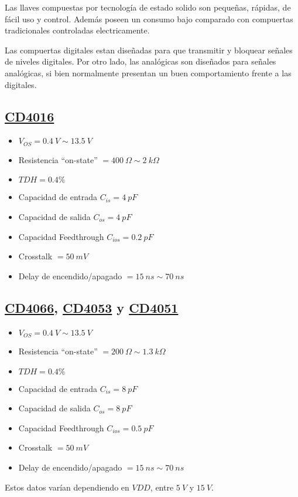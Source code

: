 



Las llaves compuestas por tecnología de estado solido son pequeñas, rápidas, de fácil uso y control. Además poseen un consumo bajo comparado con compuertas tradicionales controladas electricamente.

Las compuertas digitales estan diseñadas para que transmitir y bloquear señales de niveles digitales. Por otro lado, las analógicas son diseñados para señales analógicas, si bien normalmente presentan un buen comportamiento frente a las digitales.

\subsection{\href{http://www.ti.com/lit/ds/symlink/cd4016b.pdf}{CD4016}}
\begin{multicols}{2}
\begin{itemize}
	\item $V_{OS} = 0.4 \ V \sim 13.5 \ V$
	\item Resistencia ``on-state'' $= 400 \ \Omega \sim 2 \ k\Omega$
	\item $TDH = 0.4\%$
	\item Capacidad de entrada $C_{is} = 4 \ pF$
	\item Capacidad de salida $C_{os} = 4 \ pF$
	\item Capacidad Feedthrough $C_{ios} = 0.2 \ pF$
	\item Crosstalk $= 50 \ mV$
	\item Delay de encendido/apagado $= 15 \ ns \sim 70 \ ns$
\end{itemize}
\end{multicols}

\subsection{\href{http://www.ti.com/lit/ds/symlink/cd4066b.pdf}{CD4066}, \href{http://www.ti.com/lit/ds/symlink/cd4051b.pdf}{CD4053} y \href{http://www.ti.com/lit/ds/symlink/cd4051b.pdf}{CD4051}}
\begin{multicols}{2}
\begin{itemize}
	\item $V_{OS} = 0.4 \ V \sim 13.5 \ V$
	\item Resistencia ``on-state'' $= 200 \ \Omega \sim 1.3 \ k\Omega$
	\item $TDH = 0.4\%$
	\item Capacidad de entrada $C_{is} = 8 \ pF$
	\item Capacidad de salida $C_{os} = 8 \ pF$
	\item Capacidad Feedthrough $C_{ios} = 0.5 \ pF$
	\item Crosstalk $= 50 \ mV$
	\item Delay de encendido/apagado $= 15 \ ns \sim 70 \ ns$
\end{itemize}
\end{multicols}
Estos datos varían dependiendo en $VDD$, entre $5 \ V$ y $15 \ V$.


